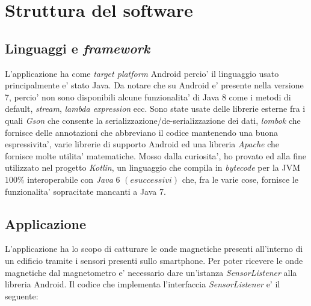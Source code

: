 \chapter{Struttura del software}

\section{Linguaggi e \textit{framework}}
L'applicazione ha come \textit{target platform} Android percio' il linguaggio usato principalmente e' stato Java. Da notare che su Android e' presente nella versione 7, percio' non sono disponibili alcune funzionalita' di Java 8 come i metodi di default, \textit{stream}, \textit{lambda expression} ecc. Sono state usate delle librerie esterne fra i quali \textit{Gson} che consente la serializzazione/de-serializzazione dei dati, \textit{lombok} che fornisce delle annotazioni che abbreviano il codice mantenendo una buona espressivita', varie librerie di supporto Android ed una libreria \textit{Apache} che fornisce molte utilita' matematiche. Mosso dalla curiosita', ho provato ed alla fine utilizzato nel progetto \textit{Kotlin}, un linguaggio che compila in \textit{bytecode} per la JVM $100 \%$ interoperabile con \textit{Java} 6 $(e successivi)$ che, fra le varie cose, fornisce le funzionalita' sopracitate mancanti a Java 7.

\section{Applicazione}
L'applicazione ha lo scopo di catturare le onde magnetiche presenti all'interno di un edificio tramite i sensori presenti sullo smartphone. Per poter ricevere le onde magnetiche dal magnetometro e' necessario dare un'istanza \textit{SensorListener} alla libreria Android. Il codice che implementa l'interfaccia \textit{SensorListener} e' il seguente:


